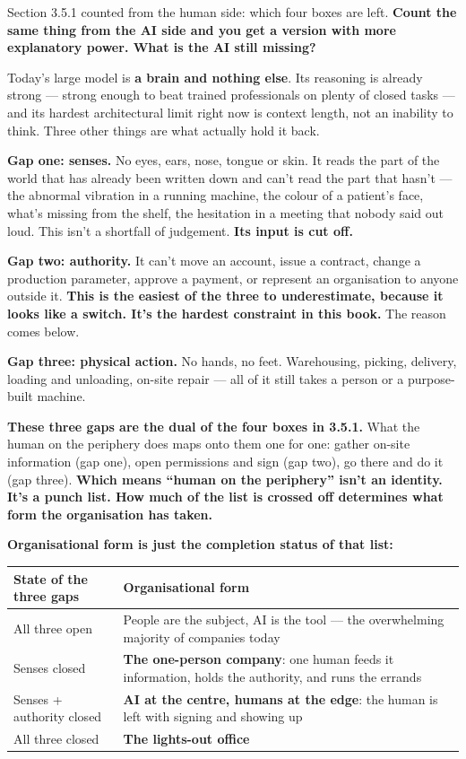 \documentclass[11pt,a4paper]{article}
\begin{document}
Section 3.5.1 counted from the human side: which four boxes are left. \textbf{Count the same thing from the AI side and you get a version with more explanatory power. What is the AI still missing?}

Today's large model is \textbf{a brain and nothing else}. Its reasoning is already strong --- strong enough to beat trained professionals on plenty of closed tasks --- and its hardest architectural limit right now is context length, not an inability to think. Three other things are what actually hold it back.

\textbf{Gap one: senses.} No eyes, ears, nose, tongue or skin. It reads the part of the world that has already been written down and can't read the part that hasn't --- the abnormal vibration in a running machine, the colour of a patient's face, what's missing from the shelf, the hesitation in a meeting that nobody said out loud. This isn't a shortfall of judgement. \textbf{Its input is cut off.}

\textbf{Gap two: authority.} It can't move an account, issue a contract, change a production parameter, approve a payment, or represent an organisation to anyone outside it. \textbf{This is the easiest of the three to underestimate, because it looks like a switch. It's the hardest constraint in this book.} The reason comes below.

\textbf{Gap three: physical action.} No hands, no feet. Warehousing, picking, delivery, loading and unloading, on-site repair --- all of it still takes a person or a purpose-built machine.

\textbf{These three gaps are the dual of the four boxes in 3.5.1.} What the human on the periphery does maps onto them one for one: gather on-site information (gap one), open permissions and sign (gap two), go there and do it (gap three). \textbf{Which means ``human on the periphery'' isn't an identity. It's a punch list. How much of the list is crossed off determines what form the organisation has taken.}

\textbf{Organisational form is just the completion status of that list:}

\begin{center}

\begin{tabularx}{\textwidth}{lX}
\toprule
State of the three gaps & Organisational form \\
\midrule
All three open & People are the subject, AI is the tool --- the overwhelming majority of companies today \\
Senses closed & \textbf{The one-person company}: one human feeds it information, holds the authority, and runs the errands \\
Senses + authority closed & \textbf{AI at the centre, humans at the edge}: the human is left with signing and showing up \\
All three closed & \textbf{The lights-out office} \\
\bottomrule
\end{tabularx}
\end{center}
\end{document}

